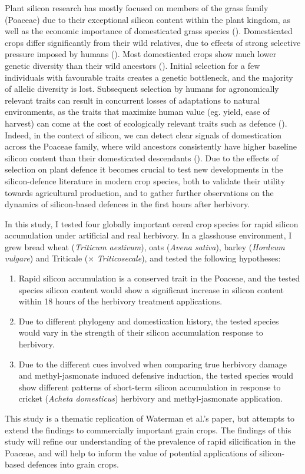 \documentclass[12pt, letterpaper, ]{article}
\begin{document}
Plant silicon research has mostly focused on members of the grass family (Poaceae) due to their exceptional silicon content within the plant kingdom, as well as the economic importance of domesticated grass species (\cite{reynolds_silicon_2016}). Domesticated crops differ significantly from their wild relatives, due to effects of strong selective pressure imposed by humans (\cite{chen_crop_2015}). Most domesticated crops show much lower genetic diversity than their wild ancestors (\cite{hafeez_creation_2021, smith_domestication_2019}). Initial selection for a few individuals with favourable traits creates a genetic bottleneck, and the majority of allelic diversity is lost. Subsequent selection by humans for agronomically relevant traits can result in concurrent losses of adaptations to natural environments, as the traits that maximize human value (eg. yield, ease of harvest) can come at the cost of ecologically relevant traits such as defence (\cite{whitehead_domestication_2017, chen_crop_2015}). Indeed, in the context of silicon, we can detect clear signals of domestication across the Poaceae family, where wild ancestors consistently have higher baseline silicon content than their domesticated descendants (\cite{simpson_still_2017}). Due to the effects of selection on plant defence it becomes crucial to test new developments in the silicon-defence literature in modern crop species, both to validate their utility towards agricultural production, and to gather further observations on the dynamics of silicon-based defences in the first hours after herbivory.

In this study, I tested four globally important cereal crop species for rapid silicon accumulation under artificial and real herbivory. In a glasshouse environment, I grew bread wheat (\textit{Triticum aestivum}), oats (\textit{Avena sativa}), barley (\textit{Hordeum vulgare}) and Triticale ($\times$ \textit{Triticosecale}), and tested the following hypotheses:
\begin{enumerate}
        \item Rapid silicon accumulation is a conserved trait in the Poaceae, and the tested species silicon content would show a significant increase in silicon content within 18 hours of the herbivory treatment applications.
        \item Due to different phylogeny and domestication history, the tested species would vary in the strength of their silicon accumulation response to herbivory. 
        \item Due to the different cues involved when comparing true herbivory damage and methyl-jasmonate induced defensive induction, the tested species would show different patterns of short-term silicon accumulation in response to cricket (\textit{Acheta domesticus}) herbivory and methyl-jasmonate application. 
\end{enumerate}
This study is a thematic replication of Waterman et al.’s  paper, but attempts to extend the findings to commercially important grain crops. The findings of this study will refine our understanding of the prevalence of rapid silicification in the Poaceae, and will help to inform the value of potential applications of silicon-based defences into grain crops.
\end{document}
